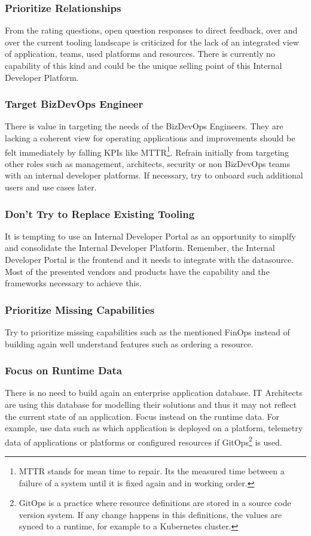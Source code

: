 \documentclass[a4paper,12pt]{article}
\begin{document}
    \subsubsection{Prioritize Relationships}
    From the rating questions, open question responses to direct feedback, over and over the current tooling landscape is
    criticized for the lack of an integrated view of application, teams, used platforms and resources.
    There is currently no capability of this kind and could be the unique selling point of this Internal Developer Platform.

    \subsubsection{Target BizDevOps Engineer}
    There is value in targeting the needs of the BizDevOps Engineers.
    They are lacking a coherent view for operating applications and improvements should be felt immediately by falling
    KPIs like MTTR\footnote{MTTR stands for mean time to repair. Its the measured time between a failure of a system
    until it is fixed again and in working order.}.
    Refrain initially from targeting other roles such as management, architects, security or non BizDevOps teams with
    an internal developer platforms.
    If necessary, try to onboard such additional users and use cases later.

    \subsubsection{Don't Try to Replace Existing Tooling}
    It is tempting to use an Internal Developer Portal as an opportunity to simplfy and consolidate the Internal
    Developer Platform.
    Remember, the Internal Developer Portal is the frontend and it needs to integrate with the datasource.
    Most of the presented vendors and products have the capability and the frameworks necessary to achieve this.

    \subsubsection{Prioritize Missing Capabilities}
    Try to prioritize missing capabilities such as the mentioned FinOps instead of building again well understand
    features such as ordering a resource.

    \subsubsection{Focus on Runtime Data}
    There is no need to build again an enterprise application database.
    IT Architects are using this database for modelling their solutions and thus it may not reflect the current state of an application.
    Focus instead on the runtime data.
    For example, use data such as which application is deployed on a platform, telemetry data of applications or platforms or
    configured resources if GitOps\footnote{
        GitOps is a practice where resource definitions are stored in a source code version system. If any change
        happens in this definitions, the values are synced to a runtime, for example to a Kubernetes cluster.} is used.
\end{document}
